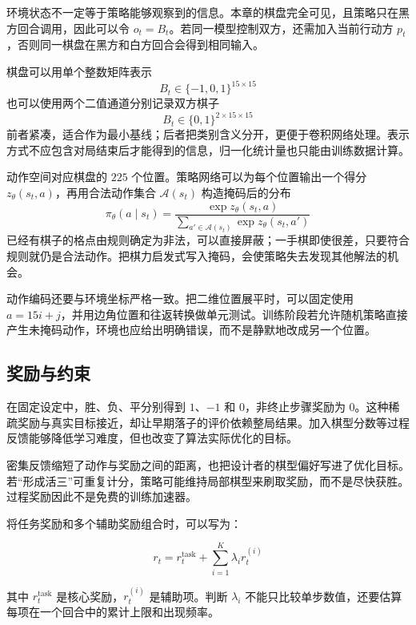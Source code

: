 \documentclass[UTF8,a4paper,zihao=-4,oneside,openany]{ctexbook}
\begin{document}
环境状态不一定等于策略能够观察到的信息。本章的棋盘完全可见，且策略只在黑方回合调用，因此可以令 $o_t=B_t$。若同一模型控制双方，还需加入当前行动方 $p_t$，否则同一棋盘在黑方和白方回合会得到相同输入。

棋盘可以用单个整数矩阵表示
\begin{equation}
B_t\in\{-1,0,1\}^{15\times15}
\end{equation}
也可以使用两个二值通道分别记录双方棋子
\begin{equation}
B_t\in\{0,1\}^{2\times15\times15}
\end{equation}
前者紧凑，适合作为最小基线；后者把类别含义分开，更便于卷积网络处理。表示方式不应包含对局结束后才能得到的信息，归一化统计量也只能由训练数据计算。

动作空间对应棋盘的 $225$ 个位置。策略网络可以为每个位置输出一个得分 $z_\theta(s_t,a)$，再用合法动作集合 $\mathcal A(s_t)$ 构造掩码后的分布
\begin{equation}
\pi_\theta(a\mid s_t)
=
\frac{\exp z_\theta(s_t,a)}
{\sum_{a'\in\mathcal A(s_t)}\exp z_\theta(s_t,a')}
\end{equation}
已经有棋子的格点由规则确定为非法，可以直接屏蔽；一手棋即使很差，只要符合规则就仍是合法动作。把棋力启发式写入掩码，会使策略失去发现其他解法的机会。

动作编码还要与环境坐标严格一致。把二维位置展平时，可以固定使用 $a=15i+j$，并用边角位置和往返转换做单元测试。训练阶段若允许随机策略直接产生未掩码动作，环境也应给出明确错误，而不是静默地改成另一个位置。

\subsection{奖励与约束}

在固定设定中，胜、负、平分别得到 $1$、$-1$ 和 $0$，非终止步骤奖励为 $0$。这种稀疏奖励与真实目标接近，却让早期落子的评价依赖整局结果。加入棋型分数等过程反馈能够降低学习难度，但也改变了算法实际优化的目标。


密集反馈缩短了动作与奖励之间的距离，也把设计者的棋型偏好写进了优化目标。若“形成活三”可重复计分，策略可能维持局部棋型来刷取奖励，而不是尽快获胜。过程奖励因此不是免费的训练加速器。

将任务奖励和多个辅助奖励组合时，可以写为：

\begin{equation}
r_t
=
r_t^{\mathrm{task}}
+
\sum_{i=1}^{K}
\lambda_i r_t^{(i)}
\end{equation}

其中 $r_t^{\mathrm{task}}$ 是核心奖励，$r_t^{(i)}$ 是辅助项。判断 $\lambda_i$ 不能只比较单步数值，还要估算每项在一个回合中的累计上限和出现频率。
\end{document}

